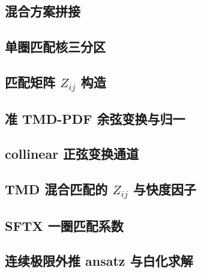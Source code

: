 \documentclass[UTF8]{ctexart}
\begin{document}
\subsection{混合方案拼接}


\subsection{单圈匹配核三分区}


\subsection{匹配矩阵 $Z_{ij}$ 构造}


\subsection{准 TMD-PDF 余弦变换与归一}


\subsection{collinear 正弦变换通道}


\subsection{TMD 混合匹配的 $Z_{ij}$ 与快度因子}


\subsection{SFTX 一圈匹配系数}


\subsection{连续极限外推 ansatz 与白化求解}


\end{document}
